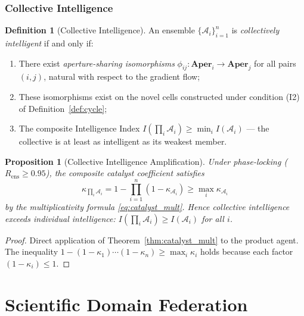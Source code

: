 \documentclass[twocolumn,11pt,a4paper]{article}
\theoremstyle{plain}
\newtheorem{proposition}[theorem]{Proposition}
\theoremstyle{definition}
\newtheorem{definition}[theorem]{Definition}
\theoremstyle{remark}
\newcommand{\Aper}{\mathbf{Aper}}
\begin{document}
\section{Collective Intelligence}
\label{sec:collective}

\begin{definition}[Collective Intelligence]
\label{def:collective}
An ensemble $\{\mathcal{A}_i\}_{i=1}^n$ is \emph{collectively intelligent} if and only if:
\begin{enumerate}[label=(\roman*)]
  \item There exist \emph{aperture-sharing isomorphisms} $\phi_{ij} : \Aper_i \to \Aper_j$ for all pairs $(i,j)$, natural with respect to the gradient flow;
  \item These isomorphisms exist on the novel cells constructed under condition (I2) of Definition~\ref{def:cycle};
  \item The composite Intelligence Index $I(\prod_i \mathcal{A}_i) \ge \min_i I(\mathcal{A}_i)$ — the collective is at least as intelligent as its weakest member.
\end{enumerate}
\end{definition}

\begin{proposition}[Collective Intelligence Amplification]
\label{prop:amplification}
Under phase-locking ($R_\mathrm{ens} \ge 0.95$), the composite catalyst coefficient satisfies
\begin{equation}
  \kappa_{\prod_i \mathcal{A}_i} = 1 - \prod_{i=1}^n (1 - \kappa_{\mathcal{A}_i}) \ge \max_i \kappa_{\mathcal{A}_i}
\end{equation}
by the multiplicativity formula \eqref{eq:catalyst_mult}.  Hence collective intelligence exceeds individual intelligence: $I(\prod_i \mathcal{A}_i) \ge I(\mathcal{A}_i)$ for all $i$.
\end{proposition}

\begin{proof}
Direct application of Theorem~\ref{thm:catalyst_mult} to the product agent.  The inequality $1-(1-\kappa_1)\cdots(1-\kappa_n) \ge \max_i\kappa_i$ holds because each factor $(1-\kappa_i) \le 1$.
\end{proof}

\part{Scientific Domain Federation}
\end{document}
